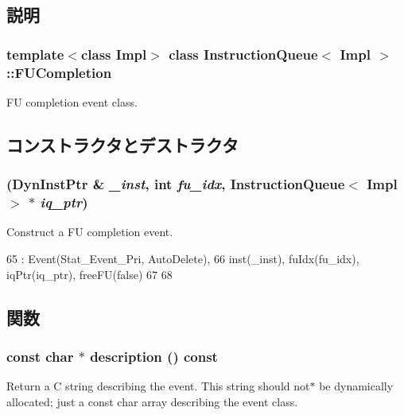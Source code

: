 \subsection{説明}
\subsubsection*{template$<$class Impl$>$ class InstructionQueue$<$ Impl $>$::FUCompletion}

FU completion event class. 

\subsection{コンストラクタとデストラクタ}
\hypertarget{classInstructionQueue_1_1FUCompletion_a61244ecdd6a72de08a00a1e3435c0d98}{
\subsubsection[{FUCompletion}]{ ({\bf DynInstPtr} \& {\em \_\-inst}, \/  int {\em fu\_\-idx}, \/  {\bf InstructionQueue}$<$ Impl $>$ $\ast$ {\em iq\_\-ptr})}}
\label{classInstructionQueue_1_1FUCompletion_a61244ecdd6a72de08a00a1e3435c0d98}
Construct a FU completion event. 


\begin{DoxyCode}
65     : Event(Stat_Event_Pri, AutoDelete),
66       inst(_inst), fuIdx(fu_idx), iqPtr(iq_ptr), freeFU(false)
67 {
68 }
\end{DoxyCode}


\subsection{関数}
\hypertarget{classInstructionQueue_1_1FUCompletion_a5a14fe478e2393ff51f02e9b7be27e00}{
\subsubsection[{description}]{\setlength{\rightskip}{0pt plus 5cm}const char $\ast$ description () const}}
\label{classInstructionQueue_1_1FUCompletion_a5a14fe478e2393ff51f02e9b7be27e00}
Return a C string describing the event. This string should not$\ast$ be dynamically allocated; just a const char array describing the event class. 


